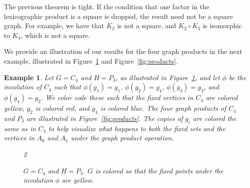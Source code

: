 \documentclass{article}
\newtheorem{example}[theorem]{Example}
\theoremstyle{definition}
\begin{document}
The previous theorem is tight. If the condition that one factor in the lexicographic product is a square is dropped, the result need not be a square graph. For example, we have that $K_2$ is not a square, and $K_2\circ K_2$ is isomorphic to $K_4$, which is not a square.


We provide an illustration of our results for the four graph products in the next example, illustrated in Figure~\ref{fig:GH} and Figure~\ref{fig:products}. 

\begin{example} \rm 
Let $G = C_4$ and $H=P_3$, as illustrated in Figure~\ref{fig:GH}, and let $\phi$ be the involution of $C_4$ such that $\phi(g_1)=g_1$, $\phi(g_2) = g_4$, $\phi(g_3)=g_3$, and $\phi(g_4)=g_2$. We color code these such that the fixed vertices in $C_4$ are colored yellow, $g_2$ is colored red, and $g_4$ is colored blue. The four graph products of $C_4$ and $P_3$ are illustrated in Figure~\ref{fig:products}. The copies of $g_i$ are colored the same as in $C_4$ to help visualize what happens to both the fixed sets and the vertices in $A_0$ and $A_1$ under the graph product operation.


\begin{figure}[ht] 
    \centering
    \begin{multicols}{2}
\columnbreak

    \end{multicols}
    \caption{$G=C_4$ and $H=P_3$. $G$ is colored so that the fixed points under the involution $\phi$ are yellow.} \label{fig:GH}
\end{figure}



\end{example}
\end{document}

